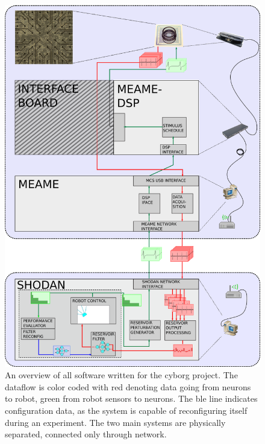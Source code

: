 \begin{figure}[h]
  \centering
  \includegraphics[width=1\textwidth]{fig/system2.png}
  \caption{An overview of all software written for the cyborg project. The
    dataflow is color coded with red denoting data going from neurons to robot,
    green from robot sensors to neurons. The ble line indicates configuration
    data, as the system is capable of reconfiguring itself during an experiment.
    The two main systems are physically separated, connected only through network.
  }
  \label{figOverview}
\end{figure}
